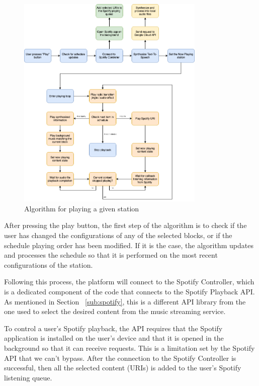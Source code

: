 \begin{figure}[h]
\centering
\includegraphics[width=0.8\textwidth]{./Images/code/alg.png}
\caption{Algorithm for playing a given station}
\label{fig:alg}
\end{figure}

After pressing the play button, the first step of the algorithm is to check if the user has changed the configurations of any of the selected blocks, or if the schedule playing order has been modified. If it is the case, the algorithm updates and processes the schedule so that it is performed on the most recent configurations of the station.

Following this process, the platform will connect to the Spotify Controller, which is a dedicated component of the code that connects to the Spotify Playback \ac{API}. As mentioned in Section ~\ref{sub:spotify}, this is a different \ac{API} library from the one used to select the desired content from the music streaming service.

To control a user's Spotify playback, the \ac{API} requires that the Spotify application is installed on the user's device and that it is opened in the background so that it can receive requests. This is a limitation set by the Spotify \ac{API} that we can't bypass. After the connection to the Spotify Controller is successful, then all the selected content (\acp{URI}) is added to the user's Spotify listening queue.

